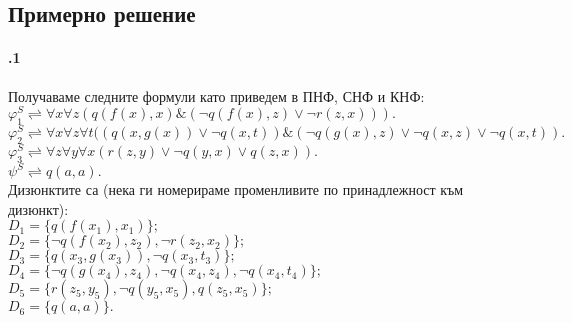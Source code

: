 \documentclass{article}
\begin{document}
\subsection{Примерно решение}
\paragraph{\hspace{0.5em} .1}
\begin{addmargin}[1em]{2em}
Получаваме следните формули като приведем в ПНФ, СНФ и КНФ: \\
$\varphi_1^S \rightleftharpoons \forall x \forall z (q(f(x), x)\&(\neg q(f(x), z)\lor \neg r(z, x))). $ \\
$\varphi_2^S \rightleftharpoons \forall x \forall z \forall t((q(x,g(x))\lor \neg q(x,t))\&(\neg q(g(x),z) \lor \neg q(x, z) \lor \neg q(x, t)). $ \\
$\varphi_3^S \rightleftharpoons \forall z \forall y \forall x ( r(z,y) \lor \neg q(y,x) \lor q(z, x)). $ \\
$\psi^S \rightleftharpoons q(a,a).$ \\
Дизюнктите са (нека ги номерираме променливите по принадлежност към дизюнкт): \\
$D_1 = \{ q(f(x_1),x_1)\};$ \\
$D_2 = \{ \neg q(f(x_2),z_2), \neg r(z_2, x_2)\};$ \\
$D_3 = \{ q(x_3, g(x_3)), \neg q(x_3, t_3)\};$ \\
$D_4 = \{ \neg q(g(x_4),z_4), \neg q(x_4, z_4), \neg q(x_4, t_4)\};$ \\
$D_5 = \{ r(z_5, y_5), \neg q(y_5, x_5), q(z_5, x_5)\};$ \\
$D_6 = \{ q(a,a)\}.$
\end{addmargin}
\end{document}
